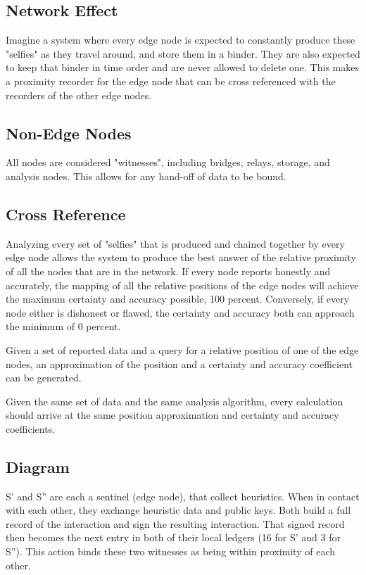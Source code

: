 \documentclass{article}
\begin{document}
\subsection {Network Effect}
Imagine a system where every edge node is expected to constantly produce these "selfies" as they travel around, and store them in a binder. They are also expected to keep that binder in time order and are never allowed to delete one.  This makes a proximity recorder for the edge node that can be cross referenced with the recorders of the other edge nodes.

\subsection {Non-Edge Nodes}
All nodes are considered "witnesses", including bridges, relays, storage, and analysis nodes.  This allows for any hand-off of data to be bound.

\subsection {Cross Reference}
Analyzing every set of "selfies" that is produced and chained together by every edge node allows the system to produce the best answer of the relative proximity of all the nodes that are in the network.  If every node reports honestly and accurately, the mapping of all the relative positions of the edge nodes will achieve the maximum certainty and accuracy possible, 100 percent.  Conversely, if every node either is dishonest or flawed, the certainty and accuracy both can approach the minimum of 0 percent.

Given a set of reported data and a query for a relative position of one of the edge nodes, an approximation of the position and a certainty and accuracy coefficient can be generated.

Given the same set of data and the same analysis algorithm, every calculation should arrive at the same position approximation and certainty and accuracy coefficients.

\subsection {Diagram}
S' and S'' are each a sentinel (edge node), that collect heuristics.  When in contact with each other, they exchange heuristic data and public keys.  Both build a full record of the interaction and sign the resulting interaction.  That signed record then becomes the next entry in both of their local ledgers (16 for S' and 3 for S'').  This action binds these two witnesses as being within proximity of each other.
\end{document}

